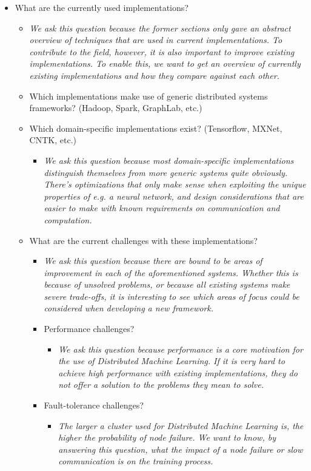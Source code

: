 \begin{itemize}
\begin{itemize}
	\end{itemize}
	\item What are the currently used implementations?
	\begin{itemize}
		\item \textit{We ask this question because the former sections only gave an abstract overview of techniques that are used in current implementations. To contribute to the field, however, it is also important to improve existing implementations. To enable this, we want to get an overview of currently existing implementations and how they compare against each other.}
		\item Which implementations make use of generic distributed systems frameworks? (Hadoop, Spark, GraphLab, etc.)
		\item Which domain-specific implementations exist? (Tensorflow, MXNet, CNTK, etc.)
		\begin{itemize}
			\item \textit{We ask this question because most domain-specific implementations distinguish themselves from more generic systems quite obviously. There’s optimizations that only make sense when exploiting the unique properties of e.g. a neural network, and design considerations that are easier to make with known requirements on communication and computation.}
		\end{itemize}
		\item What are the current challenges with these implementations?
		\begin{itemize}
			\item \textit{We ask this question because there are bound to be areas of improvement in each of the aforementioned systems. Whether this is because of unsolved problems, or because all existing systems make severe trade-offs, it is interesting to see which areas of focus could be considered when developing a new framework.}
			\item Performance challenges?
			\begin{itemize}
				\item \textit{We ask this question because performance is a core motivation for the use of Distributed Machine Learning. If it is very hard to achieve high performance with existing implementations, they do not offer a solution to the problems they mean to solve.}
			\end{itemize}
			\item Fault-tolerance challenges?
			\begin{itemize}
				\item \textit{The larger a cluster used for Distributed Machine Learning is, the higher the probability of node failure. We want to know, by answering this question, what the impact of a node failure or slow communication is on the training process.}

\end{itemize}
\end{itemize}
\end{itemize}
\end{itemize}
